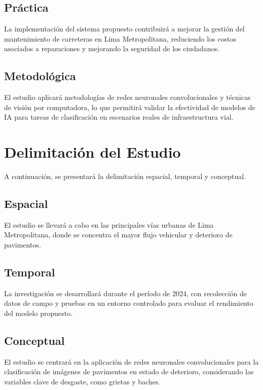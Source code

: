 	\subsection{Práctica}
	La implementación del sistema propuesto contribuirá a mejorar la gestión del mantenimiento de carreteras en Lima Metropolitana, reduciendo los costos asociados a reparaciones y mejorando la seguridad de los ciudadanos.
	\subsection{Metodológica}
	El estudio aplicará metodologías de redes neuronales convolucionales y técnicas de visión por computadora, lo que permitirá validar la efectividad de modelos de IA para tareas de clasificación en escenarios reales de infraestructura vial.
	\section{Delimitación del Estudio}
	A continuación, se presentará la delimitación espacial, temporal y conceptual.

	\subsection{Espacial}
	El estudio se llevará a cabo en las principales vías urbanas de Lima Metropolitana, donde se concentra el mayor flujo vehicular y deterioro de pavimentos.
	\subsection{Temporal}
	La investigación se desarrollará durante el período de 2024, con recolección de datos de campo y pruebas en un entorno controlado para evaluar el rendimiento del modelo propuesto.
	\subsection{Conceptual}
	El estudio se centrará en la aplicación de redes neuronales convolucionales para la clasificación de imágenes de pavimentos en estado de deterioro, considerando las variables clave de desgaste, como grietas y baches.
